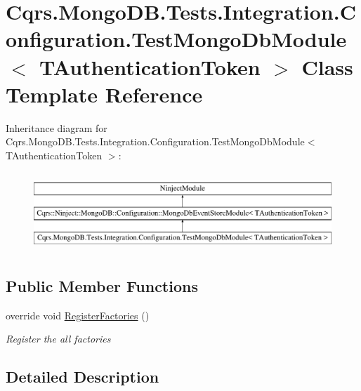 \hypertarget{classCqrs_1_1MongoDB_1_1Tests_1_1Integration_1_1Configuration_1_1TestMongoDbModule}{}\section{Cqrs.\+Mongo\+D\+B.\+Tests.\+Integration.\+Configuration.\+Test\+Mongo\+Db\+Module$<$ T\+Authentication\+Token $>$ Class Template Reference}
\label{classCqrs_1_1MongoDB_1_1Tests_1_1Integration_1_1Configuration_1_1TestMongoDbModule}


 


Inheritance diagram for Cqrs.\+Mongo\+D\+B.\+Tests.\+Integration.\+Configuration.\+Test\+Mongo\+Db\+Module$<$ T\+Authentication\+Token $>$\+:\begin{figure}[H]
\begin{center}
\leavevmode
\includegraphics[height=3.000000cm]{classCqrs_1_1MongoDB_1_1Tests_1_1Integration_1_1Configuration_1_1TestMongoDbModule}
\end{center}
\end{figure}
\subsection*{Public Member Functions}
\begin{DoxyCompactItemize}
\item 
override void \hyperlink{classCqrs_1_1MongoDB_1_1Tests_1_1Integration_1_1Configuration_1_1TestMongoDbModule_aa8a3a1f8c74becc8bb36008abe2c6e0f_aa8a3a1f8c74becc8bb36008abe2c6e0f}{Register\+Factories} ()
\begin{DoxyCompactList}\small\item\em Register the all factories \end{DoxyCompactList}\end{DoxyCompactItemize}


\subsection{Detailed Description}


